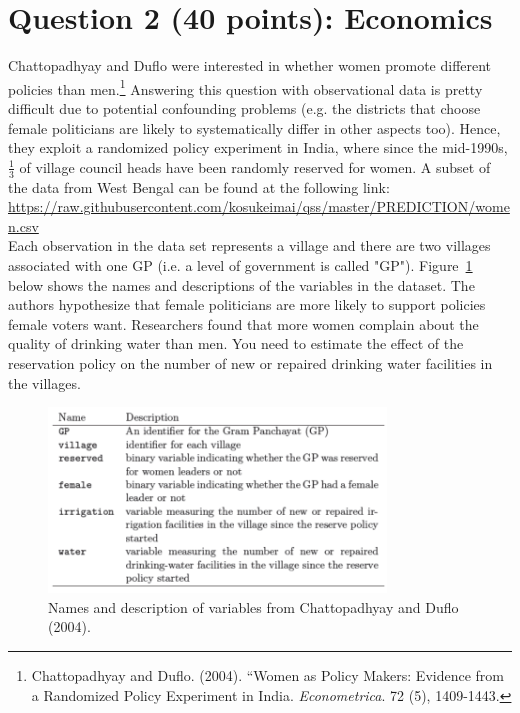 \documentclass[12pt,letterpaper]{article}
\begin{document}
\section*{Question 2 (40 points): Economics}

	Chattopadhyay and Duflo were interested in whether women promote different policies than men.\footnote{Chattopadhyay and Duflo. (2004). ``Women as Policy Makers: Evidence from a Randomized Policy Experiment in India. \textit{Econometrica}. 72 (5), 1409-1443.} Answering this question with observational data is pretty difficult due to potential confounding problems (e.g. the districts that choose female politicians are likely to systematically differ in other aspects too). Hence, they exploit a randomized policy experiment in India, where since the mid-1990s, $\frac{1}{3}$ of village council heads have been randomly reserved for women. A subset of the data from West Bengal can be found at the following link: \url{https://raw.githubusercontent.com/kosukeimai/qss/master/PREDICTION/women.csv}\\

	\noindent Each observation in the data set represents a village and there are two villages associated with one GP (i.e. a level of government is called "GP"). Figure~\ref{fig:women_desc} below shows the names and descriptions of the variables in the dataset. The authors hypothesize that female politicians are more likely to support policies female voters want. Researchers found that more women complain about the quality of drinking water than men. You need to estimate the effect of the reservation policy on the number of new or repaired drinking water facilities in the villages.
	
	\begin{figure}[h!]
		\caption{\footnotesize{Names and description of variables from Chattopadhyay and Duflo (2004).}}
		\vspace{.5cm}
		\centering
		\label{fig:women_desc}
		\includegraphics[width=0.8\textwidth]{women_desc.png}
	\end{figure}
	
\end{document}

